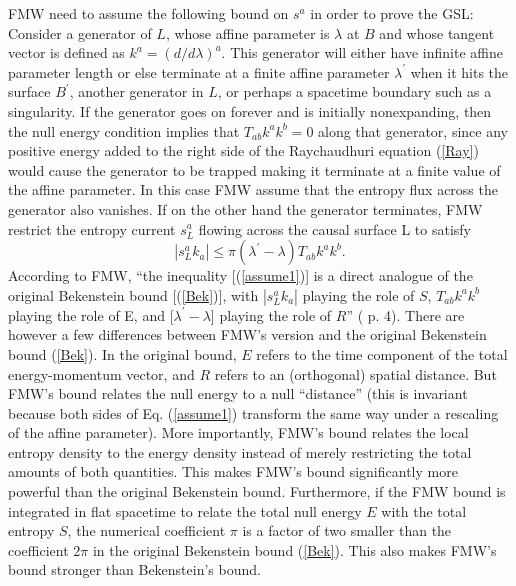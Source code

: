 \documentclass[12pt]{article}
\begin{document}
FMW need to assume the following bound on $s^a$ in order to prove the GSL: Consider a generator of $L$, whose affine parameter is $\lambda$ at $B$ and whose tangent vector is defined as $k^{a} = (d/d\lambda)^{a}$.  This generator will either have infinite affine parameter length or else terminate at a finite affine parameter $\lambda^{\prime}$ when it hits the surface $B^{\prime}$, another generator in $L$, or perhaps a spacetime boundary such as a singularity.  If the generator goes on forever and is initially nonexpanding, then the null energy condition implies that $T_{ab}k^{a}k^{b} = 0$ along that generator, since any positive energy added to the right side of the Raychaudhuri equation (\ref{Ray}) would cause the generator to be trapped making it terminate at a finite value of the affine parameter.  In this case FMW assume that the entropy flux across the generator also vanishes.  If on the other hand the generator terminates, FMW restrict the entropy current $s^{a}_L$ flowing across the causal surface L to satisfy
\begin{equation}\label{assume1}
|s^{a}_{L}k_{a}| \le \pi(\lambda^{\prime} - \lambda)T_{ab}k^{a}k^{b}.
\end{equation}
According to FMW, ``the inequality [(\ref{assume1})] is a direct analogue of the original Bekenstein bound [(\ref{Bek})], with $|s^{a}_{L}k_{a}|$ playing the role of $S$, $T_{ab}k^{a}k^{b}$ playing the role of E, and [$\lambda^{\prime} - \lambda$] playing the role of $R$'' (\cite{FMW00} p. 4).  There are however a few differences between FMW's version and the original Bekenstein bound (\ref{Bek}).  In the original bound, $E$ refers to the time component of the total energy-momentum vector, and $R$ refers to an (orthogonal) spatial distance.  But FMW's bound relates the null energy to a null ``distance'' (this is invariant because both sides of Eq. (\ref{assume1}) transform the same way under a rescaling of the affine parameter).  More importantly, FMW's bound relates the local entropy density to the energy density instead of merely restricting the total amounts of both quantities.  This makes FMW's bound significantly more powerful than the original Bekenstein bound.  Furthermore, if the FMW bound is integrated in flat spacetime to relate the total null energy $E$ with the total entropy $S$, the numerical coefficient $\pi$ is a factor of two smaller than the coefficient $2\pi$ in the original Bekenstein bound (\ref{Bek}).  This also makes FMW's bound stronger than Bekenstein's bound.
\end{document}
